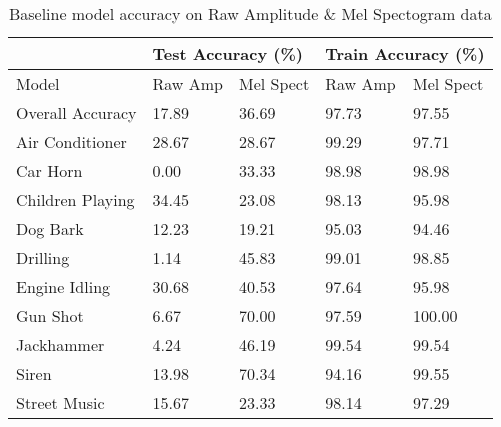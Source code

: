 \documentclass[11pt]{article}
\begin{document}
\begin{table}[h!]
\centering
\begin{tabular}{lllll}
                 & \multicolumn{2}{l}{Test Accuracy (\%)} & \multicolumn{2}{l}{Train Accuracy (\%)} \\ \toprule
Model            & Raw Amp           & Mel Spect          & Raw Amp           & Mel Spect           \\ \toprule
Overall Accuracy & 17.89             & 36.69              & 97.73             & 97.55               \\ \midrule
Air Conditioner  & 28.67             & 28.67              & 99.29             & 97.71               \\
Car Horn         & 0.00              & 33.33              & 98.98             & 98.98               \\
Children Playing & 34.45             & 23.08              & 98.13             & 95.98               \\
Dog Bark         & 12.23             & 19.21              & 95.03             & 94.46               \\
Drilling         & 1.14              & 45.83              & 99.01             & 98.85               \\
Engine Idling    & 30.68             & 40.53              & 97.64             & 95.98               \\
Gun Shot         & 6.67              & 70.00              & 97.59             & 100.00              \\
Jackhammer       & 4.24              & 46.19              & 99.54             & 99.54               \\
Siren            & 13.98             & 70.34              & 94.16             & 99.55               \\
Street Music     & 15.67             & 23.33              & 98.14             & 97.29               \\ \bottomrule
\end{tabular}
\caption{\label{tab:2} Baseline model accuracy on Raw Amplitude \& Mel Spectogram data}
\end{table}

\end{document}
